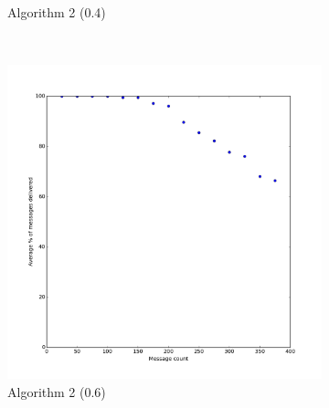 \documentclass[bsc,frontabs,twoside,singlespacing,parskip,deptreport]{infthesis}     %
\begin{document}
\begin{figure}
\begin{subfigure}[b]{0.3\textwidth}
        \caption{Algorithm 2 (0.4)}
        \label{fig:results/BasicShare_Prob40}
    \end{subfigure}
    ~ %
    

    \begin{subfigure}[b]{0.3\textwidth}
        \includegraphics[width=\textwidth]{results/BasicShare_Prob60}
        \caption{Algorithm 2 (0.6)}
        \label{fig:results/BasicShare_Prob60}
    \end{subfigure}
    ~ %
    \begin{subfigure}[b]{0.3\textwidth}

\end{subfigure}
\end{figure}
\end{document}
